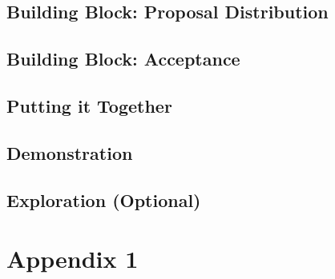 \documentclass[]{article}
\begin{document}
\subsection{Building Block: Proposal Distribution}


\subsection{Building Block: Acceptance}


\subsection{Putting it Together}


\subsection{Demonstration}


\subsection{Exploration (Optional)}

\newpage
\section{Appendix 1}

\end{document}

